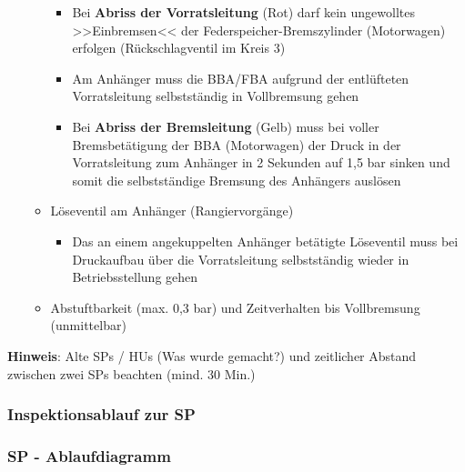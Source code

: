 \documentclass{vorlage-design-main}
\begin{document}
\begin{enumerate}
\begin{itemize}
    \begin{itemize}

    \item
      Bei \textbf{Abriss der Vorratsleitung} (Rot) darf kein ungewolltes
      >>Einbremsen<< der Federspeicher-Bremszylinder (Motorwagen)
      erfolgen (Rückschlagventil im Kreis 3)
    \item
      Am Anhänger muss die BBA/FBA aufgrund der entlüfteten
      Vorratsleitung selbstständig in Vollbremsung gehen
    \item
      Bei \textbf{Abriss der Bremsleitung} (Gelb) muss bei voller
      Bremsbetätigung der BBA (Motorwagen) der Druck in der
      Vorratsleitung zum Anhänger in 2 Sekunden auf 1,5 bar sinken und
      somit die selbstständige Bremsung des Anhängers auslösen
    \end{itemize}
  \item
    Löseventil am Anhänger (Rangiervorgänge)

    \begin{itemize}

    \item
      Das an einem angekuppelten Anhänger betätigte Löseventil muss bei
      Druckaufbau über die Vorratsleitung selbstständig wieder in
      Betriebsstellung gehen
    \end{itemize}
  \item
    Abstuftbarkeit (max. 0,3 bar) und Zeitverhalten bis Vollbremsung
    (unmittelbar)
  \end{itemize}
\end{enumerate}

\textbf{Hinweis}: Alte SPs / HUs (Was wurde gemacht?) und zeitlicher
Abstand zwischen zwei SPs beachten (mind. 30 Min.)

\subsubsection{Inspektionsablauf zur SP}\label{inspektionsablauf-zur-sp}

\subsubsection{SP - Ablaufdiagramm}\label{sp---ablaufdiagramm}
\end{document}
